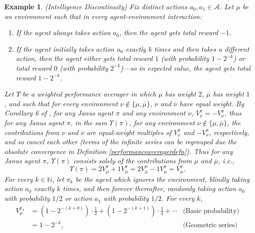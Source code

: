\documentclass{article}
\newtheorem{example}[theorem]{Example}
\begin{document}
\begin{example}
    (Intelligence Discontinuity)
    Fix distinct actions $a_0,a_1\in\mathcal A$.
    Let $\mu$ be an environment such that in every agent-environment interaction:
    \begin{enumerate}
        \item If the agent always takes action $a_0$, then the agent gets total reward $-1$.
        \item If the agent initially takes action $a_0$ exactly $k$ times and
            then takes a different action, then the agent either
            gets total reward $1$ (with probability $1-2^{-k}$)
            or total reward $0$ (with probability $2^{-k}$)---so in expected
            value, the agent gets total reward $1-2^{-k}$.
    \end{enumerate}
    Let $\Upsilon$ be a weighted performance averager in which $\mu$ has weight $2$,
    $\overline\mu$ has weight $1$, and such that for every
    environment $\nu\not\in\{\mu,\overline{\mu}\}$, $\nu$ and $\overline{\nu}$ have
    equal weight.
    By Corollary 6 of \cite{alexander2021reward}, for any Janus agent $\pi$ and
    any environment $\nu$, $V^\pi_{\overline\nu}=-V^\pi_{\nu}$, thus for any Janus agent $\pi$,
    in the sum $\Upsilon(\pi)$, for any environment $\nu\not\in\{\mu,\overline{\mu}\}$,
    the contributions from $\nu$ and $\overline\nu$ are equal-weight multiples of
    $V^\pi_{\nu}$ and $-V^\pi_{\nu}$,
    respectively, and so cancel each other
    (terms of the infinite series can be regrouped due the absolute convergence
    in Definition \ref{performanceaveragerdefn}).
    Thus for any Janus agent $\pi$,
    $\Upsilon(\pi)$ consists solely of the contributions from $\mu$ and $\overline\mu$,
    i.e.,
    \[
        \Upsilon(\pi)=2V^\pi_\mu+1V^\pi_{\overline\mu}
        =2V^\pi_\mu-1V^\pi_{\mu}=V^\pi_\mu.
    \]
    For every $k\in\mathbb N$, let $\pi_k$ be the agent which ignores the environment,
    blindly taking action $a_0$ exactly $k$ times, and then forever thereafter,
    randomly taking action $a_0$ with probability $1/2$ or action $a_1$ with probability
    $1/2$.
    For every $k$,
    \begin{align*}
        V^{\pi_k}_\mu
            &= (1-2^{-(k+0)})\cdot \mbox{$\frac12$}
                +(1-2^{-(k+1)})\cdot\mbox{$\frac14$} + \cdots
                    &\mbox{(Basic probability)}\\
            &= 1-2^{-k},
                    &\mbox{(Geometric series)}
    \end{align*}

\end{example}
\end{document}
